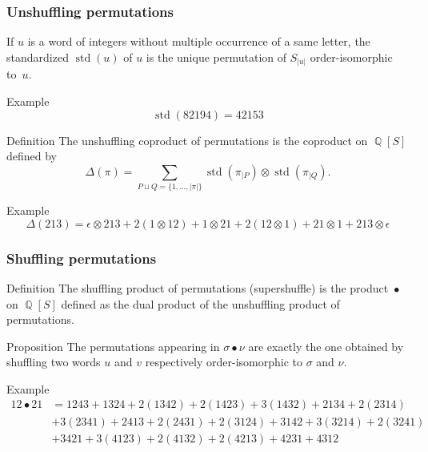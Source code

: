 \documentclass[unknownkeysallowed,10pt,xcolor={dvipsnames}]{beamer}
\DeclareMathOperator{\QQ}{\mathbb{Q}}
\DeclareMathOperator{\STD}{\mathrm{std}}
\DeclareMathOperator{\SHUFFLE}{\bullet}
\begin{document}
\begin{frame} \frametitle{Unshuffling permutations}
If $u$ is a word of integers without multiple occurrence of a same letter,
the \alert{standardized} $\STD(u)$ of $u$ is the unique permutation of
$S_{|u|}$ order-isomorphic to~$u$.

\begin{block}{Example}
\begin{equation*}
    \STD(82194) = 42153
\end{equation*}
\end{block}
\medskip

\begin{block}{Definition}
    The \alert{unshuffling coproduct of permutations} is the
    coproduct on $\QQ[S]$ defined by
    \begin{equation*}
        \Delta(\pi) =
        \sum_{P \sqcup Q = \{1, \dots, |\pi|\}}
        \STD\left(\pi_{|P}\right) \otimes \STD\left(\pi_{|Q}\right).
    \end{equation*}
\end{block}

\begin{block}{Example}
\begin{equation*}
    \Delta(213) =
    \epsilon \otimes 213 + 2 (1 \otimes 12) +
    1 \otimes 21 + 2 (12 \otimes 1) + 21 \otimes 1
    + 213 \otimes \epsilon
\end{equation*}
\end{block}
\end{frame}

\begin{frame} \frametitle{Shuffling permutations}
\begin{block}{Definition}
    The \alert{shuffling product of permutations} (supershuffle) is the
    product $\SHUFFLE$ on $\QQ[S]$ defined as the dual product of the
    unshuffling product of permutations.
\end{block}
\medskip

\begin{block}{Proposition}
The permutations appearing in $\sigma \SHUFFLE \nu$ are exactly the
one obtained by shuffling two words $u$ and $v$ respectively
order-isomorphic to $\sigma$ and $\nu$.
\end{block}
\medskip

\begin{block}{Example}
\begin{equation*}\begin{split}
    12 \SHUFFLE 21 & =
    1243 + 1324 + 2 (1342) + 2 (1423) + 3 (1432) +
    2134 + 2 (2314) \\[.5em]
    & + 3 (2341) + 2413 + 2 (2431) + 2 (3124) + 3142 +
    3 (3214) + 2 (3241) \\[.5em]
    & + 3421 + 3 (4123) + 2 (4132) + 2 (4213) + 4231 + 4312
\end{split}\end{equation*}
\end{block}
\end{frame}
\end{document}
